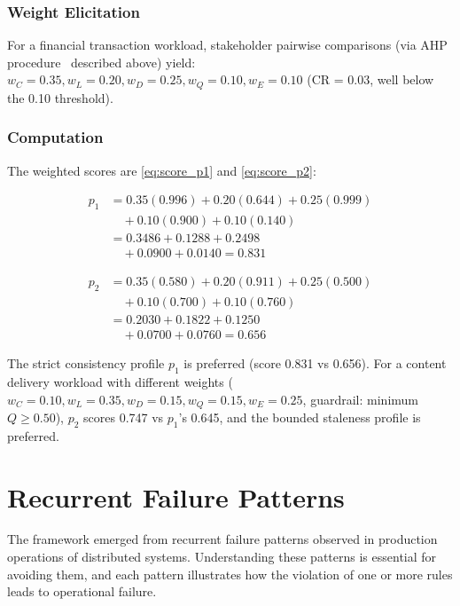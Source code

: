 \documentclass[conference]{IEEEtran}
\begin{document}
\subsubsection{Weight Elicitation}
\label{sec:ahp}
For a financial transaction workload, stakeholder pairwise comparisons (via AHP procedure~\cite{saaty2008decision} described above) yield:
$w_C = 0.35, w_L = 0.20, w_D = 0.25, w_Q = 0.10, w_E = 0.10$ (CR = 0.03, well below the 0.10 threshold).

\subsubsection{Computation}

The weighted scores are \eqref{eq:score_p1} and \eqref{eq:score_p2}:

\begin{align}
p_1 &= 0.35(0.996)+0.20(0.644)+0.25(0.999) \nonumber\\
    &\quad +0.10(0.900)+0.10(0.140) \nonumber\\
    &=0.3486+0.1288+0.2498 \nonumber\\
    &\quad +0.0900+0.0140=0.831
\label{eq:score_p1}
\end{align}

\begin{align}
p_2 &=0.35(0.580)+0.20(0.911)+0.25(0.500) \nonumber\\
    &\quad +0.10(0.700)+0.10(0.760) \nonumber\\
    &=0.2030+0.1822+0.1250 \nonumber\\
    &\quad +0.0700+0.0760=0.656
\label{eq:score_p2}
\end{align}

The strict consistency profile $p_1$ is preferred (score 0.831 vs 0.656). For a content delivery workload with different weights ($w_C = 0.10, w_L = 0.35, w_D = 0.15, w_Q = 0.15, w_E = 0.25$, guardrail: minimum $Q \geq 0.50$), $p_2$ scores 0.747 vs $p_1$'s 0.645, and the bounded staleness profile is preferred.

\section{Recurrent Failure Patterns}
\label{sec:patterns}
The framework emerged from recurrent failure patterns observed in production operations of distributed systems. Understanding these patterns is essential for avoiding them, and each pattern illustrates how the violation of one or more rules leads to operational failure.
\end{document}

